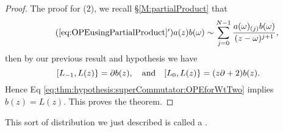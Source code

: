 \begin{proof}
The proof for (2), we recall \S\ref{M:partialProduct} that
\begin{equation*}\tag{\ref{eq:OPEusingPartialProduct}$'$}
a(z)b(\omega)\sim\sum^{N-1}_{j=0}\frac{a(\omega)_{(j)}b(\omega)}{(z-\omega)^{j+1}},
\end{equation*}
then by our previous result and hypothesis we have
\begin{equation}
[L_{-1},L(z)\}=\partial b(z),\quad\mbox{and}\quad
[L_{0},L(z)\}=(z\partial+2)b(z).
\end{equation}
Hence Eq \eqref{eq:thm:hypothesis:superCommutator:OPEforWtTwo} implies 
$b(z)=L(z)$. This proves the theorem.
\end{proof}

\begin{rmk}
This sort of distribution we just described is called a 
.
\end{rmk}